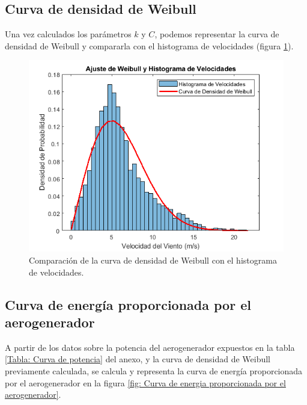 \documentclass{IEEEtran}
\begin{document}
\subsection{Curva de densidad de Weibull}

Una vez calculados los parámetros $k$ y $C$, podemos representar la curva de densidad de Weibull y compararla con el histograma de velocidades (figura \ref{fig: Curva de densidad de Weibull vs Histograma de velocidades}).

\begin{figure}[h]
    \centering
    \includegraphics[width = 0.5 \textwidth]{Imagenes/Ajuste de Weibull y Histograma de Velocidades.png}
    \caption{Comparación de la curva de densidad de Weibull con el histograma de velocidades.}
    \label{fig: Curva de densidad de Weibull vs Histograma de velocidades}
\end{figure}

\subsection{Curva de energía proporcionada por el aerogenerador}

A partir de los datos sobre la potencia del aerogenerador expuestos en la tabla \ref{Tabla: Curva de potencia} del anexo, y la curva de densidad de Weibull previamente calculada, se calcula y representa la curva de energía proporcionada por el aerogenerador en la figura \ref{fig: Curva de energia proporcionada por el aerogenerador}.
\end{document}
